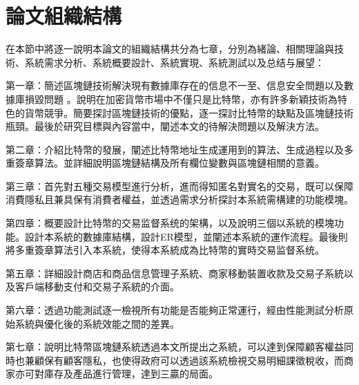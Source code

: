 	\section{論文組織結構}
	在本節中將逐一說明本論文的組織結構共分為七章，分別為緒論、相關理論與技術、系統需求分析、系統概要設計、系統實現、系統測試以及总结与展望：

	第一章：簡述區塊鏈技術解決現有數據庫存在的信息不一至、信息安全問題以及數據庫損毀問題
	。說明在加密貨幣市場中不僅只是比特幣，亦有許多新穎技術為特色的貨幣競爭。簡要探討區塊鏈技術的優點，逐一探討比特幣的缺點及區塊鏈技術瓶頸。最後於研究目標與內容當中，闡述本文的待解決問題以及解決方法。

	第二章：介紹比特幣的發展，闡述比特幣地址生成運用到的算法、生成過程以及多重簽章算法。並詳細說明區塊鏈結構及所有欄位變數與區塊鏈相關的意義。

	第三章：首先對五種交易模型進行分析，進而得知匿名對實名的交易，既可以保障消費隱私且兼具保有消費者權益，並透過需求分析探討本系統需構建的功能模塊。

	第四章：概要設計比特幣的交易监督系统的架構，以及說明三個以系統的模塊功能。設計本系統的數據庫結構，設計ER模型，並闡述本系統的運作流程。最後則將多重簽章算法引入本系統，使得本系統成為比特幣的實時交易监督系统。

	第五章：詳細設計商店和商品信息管理子系統、商家移動裝置收款及交易子系統以及客戶端移動支付和交易子系統的介面。

	第六章：透過功能測試逐一檢視所有功能是否能夠正常運行，經由性能測試分析原始系統與優化後的系統效能之間的差異。

	第七章：說明比特幣區塊鏈系統透過本文所提出之系統，可以達到保障顧客權益同時也兼顧保有顧客隱私，也使得政府可以透過該系統檢視交易明細課徵稅收，而商家亦可對庫存及產品進行管理，達到三贏的局面。
